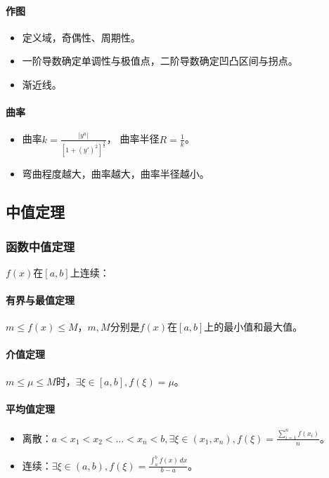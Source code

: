 \documentclass[
12pt, %
a4paper, 
oneside, %
headinclude,footinclude, %
]{scrartcl}
\begin{document}
\paragraph{作图}
\begin{itemize}
\item 定义域，奇偶性、周期性。
\item 一阶导数确定单调性与极值点，二阶导数确定凹凸区间与拐点。
\item 渐近线。
\end{itemize}
\paragraph{曲率}
\begin{itemize}
\item 曲率$ k = \frac{|y^n|}{[1 + (y')^2]^{\frac{3}{2}}} $，
曲率半径$ R = \frac{1}{k} $。
\item 弯曲程度越大，曲率越大，曲率半径越小。
\end{itemize}
\subsection[中值定理]{中值定理}
\subsubsection[函数中值定理]{函数中值定理}
$ f(x) $在$ [a, b] $上连续：
\paragraph{有界与最值定理}
$ m \leq f(x) \leq M $，$ m,M $分别是$ f(x) $在$ [a, b] $上的最小值和最大值。
\paragraph{介值定理}
$ m \leq \mu \leq M $时，$ \exists \xi \in [a, b], f(\xi) = \mu $。
\paragraph{平均值定理}
\begin{itemize}
\item 离散：$ a < x_1 < x_2 < \dots < x_n < b, \exists \xi \in (x_1, x_n), f(\xi) = \frac{\sum_{i = 1}^n f(x_i)}{n} $。
\item 连续：$ \exists \xi \in (a, b), f(\xi) = \frac{\int_{a}^{b} f(x)\,dx }{b - a} $。
\end{itemize}
\end{document}
